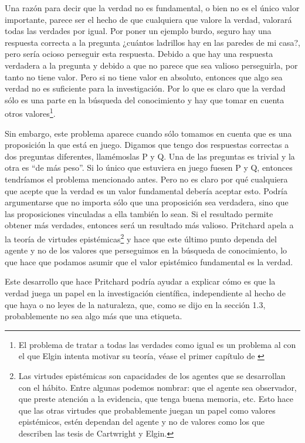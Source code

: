Una razón para decir que la verdad no es fundamental, o bien no es el único valor importante, parece ser el hecho de que cualquiera que valore la verdad, valorará todas las verdades por igual. Por poner un ejemplo burdo, seguro hay una respuesta correcta a la pregunta ¿cuántos ladrillos hay en las paredes de mi casa?, pero sería ocioso perseguir esta respuesta. Debido a que hay una respuesta verdadera a la pregunta y debido a que no parece que sea valioso perseguirla, por tanto no tiene valor. Pero si no tiene valor en absoluto, entonces que algo sea verdad no es suficiente para la investigación. Por lo que es claro que la verdad sólo es una parte en la búsqueda del conocimiento y hay que tomar en cuenta otros valores\footnote{El problema de tratar a todas las verdades como igual es un problema al con el que Elgin intenta motivar su teoría, véase el primer capítulo de \cite{Elgin2017}}.

Sin embargo, este problema aparece cuando sólo tomamos en cuenta que es una proposición la que está en juego. Digamos que tengo dos respuestas correctas a dos preguntas diferentes, llamémoslas P y Q. Una de las preguntas es trivial y la otra es ``de más peso''. Si lo único que estuviera en juego fuesen P y Q, entonces tendríamos el problema mencionado antes. Pero no es claro por qué cualquiera que acepte que la verdad es un valor fundamental debería aceptar esto. Podría argumentarse que no importa sólo que una proposición sea verdadera, sino que las proposiciones vinculadas a ella también lo sean. Si el resultado permite obtener más verdades, entonces será un resultado más valioso. Pritchard apela a la teoría de virtudes epistémicas\footnote{Las virtudes epistémicas son capacidades de los agentes que se desarrollan con el hábito. Entre algunas podemos nombrar: que el agente sea observador, que preste atención a la evidencia, que tenga buena memoria, etc. Esto hace que las otras virtudes que probablemente juegan un papel como valores epistémicos, estén dependan del agente y no de valores como los que describen las tesis de Cartwright y Elgin.} y hace que este último punto dependa del agente y no de los valores que perseguimos en la búsqueda de conocimiento, lo que hace que podamos asumir que el valor epistémico fundamental es la verdad.

Este desarrollo que hace Pritchard podría ayudar a explicar cómo es que la verdad juega un papel en la investigación científica, independiente al hecho de que haya o no leyes de la naturaleza, que, como se dijo en la sección 1.3, probablemente no sea algo más que una etiqueta.


